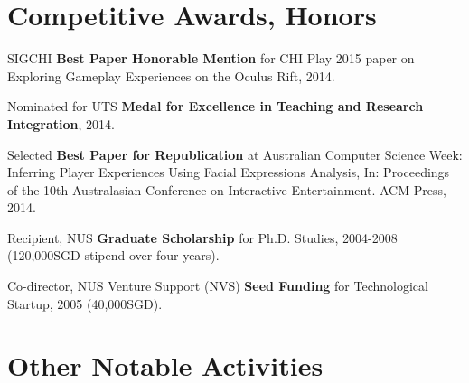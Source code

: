 \documentclass[10pt,a4paper]{article}
\renewenvironment{itemize}{
  \begin{list}{}{
    \setlength{\leftmargin}{1.5em}
    \setlength{\itemsep}{0.25em}
    \setlength{\parskip}{0pt}
    \setlength{\parsep}{0.25em}
  }
}{
  \end{list}
}
\begin{document}
\section*{Competitive Awards, Honors}
\begin{itemize}
    \item SIGCHI \textbf{Best Paper Honorable Mention} for CHI Play 2015 paper on Exploring Gameplay Experiences on the Oculus Rift, 2014.

    \item Nominated for UTS \textbf{Medal for Excellence in Teaching and Research Integration}, 2014.

    \item Selected \textbf{Best Paper for Republication} at Australian Computer Science Week: Inferring Player Experiences Using Facial Expressions Analysis, In: Proceedings of the 10th Australasian Conference on Interactive Entertainment. ACM Press, 2014.

    \item Recipient, NUS \textbf{Graduate Scholarship} for Ph.D. Studies,
        2004-2008 (120,000SGD stipend over four years).

    \item Co-director, NUS Venture Support (NVS) \textbf{Seed Funding} for Technological Startup,
        2005 (40,000SGD).
\end{itemize}

\section*{Other Notable Activities}
\end{document}
